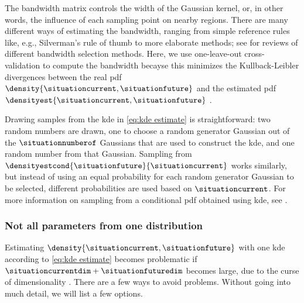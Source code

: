 The bandwidth matrix controls the width of the Gaussian kernel, or, in other words, the influence of each sampling point on nearby regions. 
There are many different ways of estimating the bandwidth, ranging from simple reference rules like, e.g., Silverman's rule of thumb \autocite{silverman1986density} to more elaborate methods; see \autocite{turlach1993bandwidthselection, chiu1996comparative, jones1996brief, bashtannyk2001bandwidth, zambom2013review} for reviews of different bandwidth selection methods.
Here, we use one-leave-out cross-validation to compute the bandwidth becayse this minimizes the Kullback-Leibler divergences between the real \ac{pdf} $\density{\situationcurrent, \situationfuture}$ and the estimated \ac{pdf} $\densityest{\situationcurrent, \situationfuture}$ \autocite{turlach1993bandwidthselection, zambom2013review}.

Drawing samples from the \ac{kde} in \cref{eq:kde estimate} is straightforward: two random numbers are drawn, one to choose a random generator Gaussian out of the $\situationnumberof$ Gaussians that are used to construct the \ac{kde}, and one random number from that Gaussian.
Sampling from $\densityestcond{\situationfuture}{\situationcurrent}$ works similarly, but instead of using an equal probability for each random generator Gaussian to be selected, different probabilities are used based on $\situationcurrent$.
For more information on sampling from a conditional \ac{pdf} obtained using \ac{kde}, see \autocite{holmes2012fast}.



\subsubsection{Not all parameters from one distribution}
\label{sec:no special case}

Estimating $\density{\situationcurrent, \situationfuture}$ with one \ac{kde} according to \cref{eq:kde estimate} becomes problematic if $\situationcurrentdim + \situationfuturedim$ becomes large, due to the curse of dimensionality \cite{scott2015multivariate}.
There are a few ways to avoid problems.
Without going into much detail, we will list a few options.

